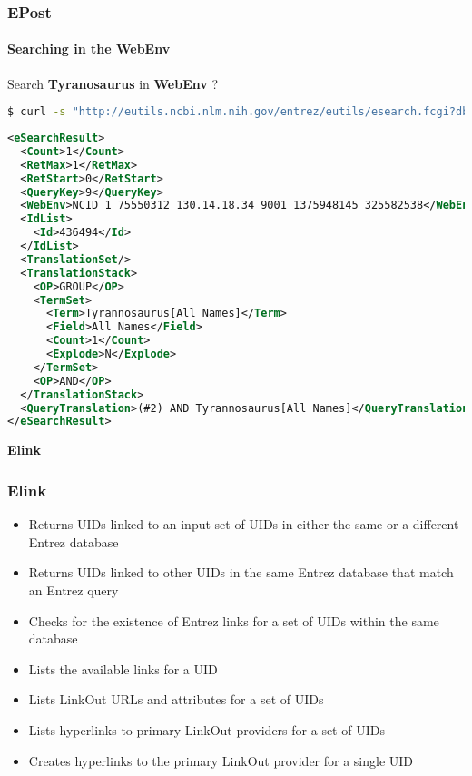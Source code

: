\documentclass{beamer}
\newcommand{\centeredtitle}[1]{
\begin{center}
    \Huge{\bf{#1}}
\end{center}
}
\newcommand{\hugeslide}[1]{
\begin{frame}
\centeredtitle{#1}
\end{frame}
}
\begin{document}
\begin{frame}[fragile]
\frametitle{EPost}
\framesubtitle{Searching in the WebEnv}
Search {\bf Tyranosaurus} in {\bf WebEnv} ?
\begin{lstlisting}[language=bash,basicstyle=\tiny,breaklines=true,escapechar=\!]
$ curl -s "http://eutils.ncbi.nlm.nih.gov/entrez/eutils/esearch.fcgi?db=taxonomy&term=!\color{red}{Tyrannosaurus}!&usehistory=y&WebEnv=NCID_1_75550312_130.14.18.34_9001_1375948145_325582538&query_key=2"
\end{lstlisting}

\begin{lstlisting}[language=xml,basicstyle=\tiny,breaklines=true,escapechar=\%]
<eSearchResult>
  <Count>1</Count>
  <RetMax>1</RetMax>
  <RetStart>0</RetStart>
  <QueryKey>9</QueryKey>
  <WebEnv>NCID_1_75550312_130.14.18.34_9001_1375948145_325582538</WebEnv>
  <IdList>
    <Id>436494</Id>
  </IdList>
  <TranslationSet/>
  <TranslationStack>
    <OP>GROUP</OP>
    <TermSet>
      <Term>Tyrannosaurus[All Names]</Term>
      <Field>All Names</Field>
      <Count>1</Count>
      <Explode>N</Explode>
    </TermSet>
    <OP>AND</OP>
  </TranslationStack>
  <QueryTranslation>(#2) AND Tyrannosaurus[All Names]</QueryTranslation>
</eSearchResult>
\end{lstlisting}
\end{frame}




\hugeslide{Elink}

\begin{frame}[fragile]
\frametitle{Elink}
\begin{itemize}
\item Returns UIDs linked to an input set of UIDs in either the same or a different Entrez database
\item Returns UIDs linked to other UIDs in the same Entrez database that match an Entrez query
\item Checks for the existence of Entrez links for a set of UIDs within the same database
\item Lists the available links for a UID
\item Lists LinkOut URLs and attributes for a set of UIDs
\item Lists hyperlinks to primary LinkOut providers for a set of UIDs
\item Creates hyperlinks to the primary LinkOut provider for a single UID
\end{itemize}
\end{frame}
\end{document}
